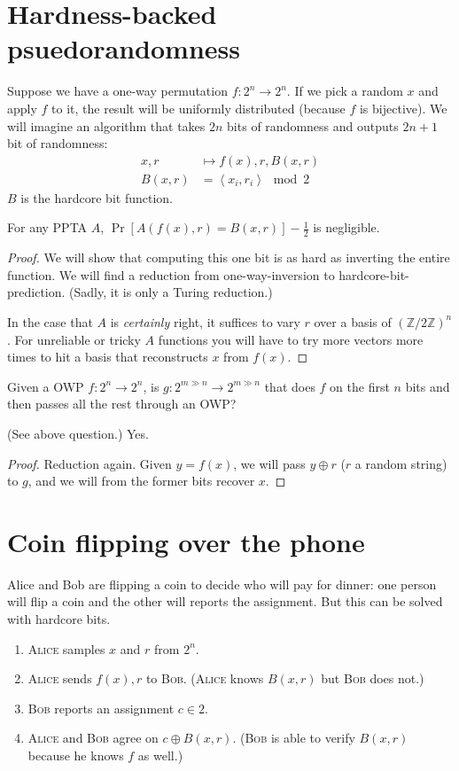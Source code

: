 \section{Hardness-backed psuedorandomness}
Suppose we have a one-way permutation \(f: 2^n \to 2^n\).
If we pick a random \(x\) and apply \(f\) to it, the result will be uniformly distributed (because \(f\) is bijective).
We will imagine an algorithm that takes \(2n\) bits of randomness and outputs \(2n+1\) bit of randomness:
\begin{align}
x, r &\mapsto f(x), r, B(x,r) \\
B(x, r) &= \left\langle x_i, r_i\right\rangle \mod 2
\end{align}
\(B\) is the hardcore bit function.
\begin{theorem}
	For any PPTA \(A\), \(\Pr\left[ A\left(f(x), r\right) = B(x, r)\right] - \frac{1}{2}\) is negligible.
\end{theorem}
\begin{proof}
	We will show that computing this one bit is as hard as inverting the entire function.
	We will find a reduction from one-way-inversion to hardcore-bit-prediction. (Sadly, it is only a Turing reduction.)
	
	In the case that \(A\) is \emph{certainly} right, it suffices to vary \(r\) over a basis of \(\left(\mathbb{Z}/2\mathbb{Z}\right)^n\).
	For unreliable or tricky \(A\) functions you will have to try more vectors more times to hit a basis that reconstructs \(x\) from \(f(x)\).
\end{proof}

Given a OWP \(f: 2^n \to 2^n\), is \(g: 2^{m \gg n} \to 2^{m \gg n}\) that does \(f\) on the first \(n\) bits and then passes all the rest through an OWP?
\begin{theorem}
	(See above question.) Yes.
\end{theorem}
\begin{proof}
	Reduction again. Given \(y = f(x)\), we will pass \(y\oplus r\) (\(r\) a random string) to \(g\), and we will from the former bits recover \(x\).
\end{proof}

\section{Coin flipping over the phone}
Alice and Bob are flipping a coin to decide who will pay for dinner: one person will flip a coin and the other will reports the assignment.
But this can be solved with hardcore bits.

\begin{enumerate}
	\item \textsc{Alice} samples \(x\) and \(r\) from \(2^n\).
	\item \textsc{Alice} sends \(f(x), r\) to \textsc{Bob}. (\textsc{Alice} knows \(B(x,r)\) but \textsc{Bob} does not.)
	\item \textsc{Bob} reports an assignment \(c\in 2\).
	\item \textsc{Alice} and \textsc{Bob} agree on \(c\oplus B(x, r)\). (\textsc{Bob} is able to verify \(B(x,r)\) because he knows \(f\) as well.)
\end{enumerate}
